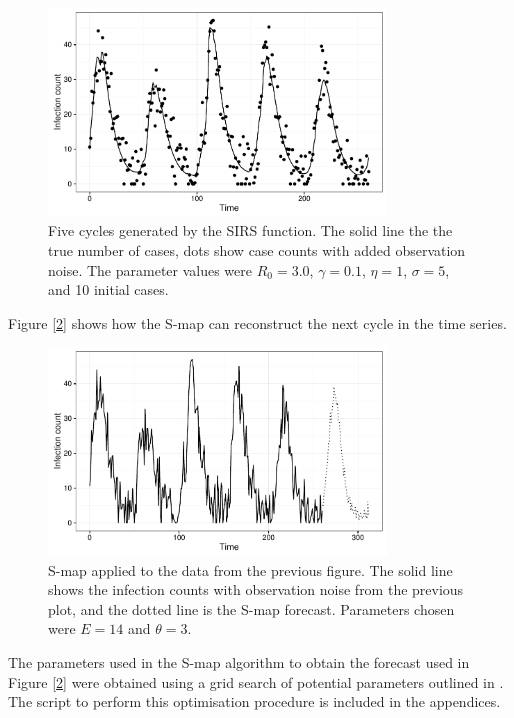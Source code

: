 	\begin{figure}
        \centering
        \captionsetup{width=.8\linewidth}
        \includegraphics[width=0.8\textwidth]{./images/dataplot.pdf}
        \caption{Five cycles generated by the SIRS function. The solid line the the true number of cases, dots show case counts with added observation noise. The parameter values were $R_0 = 3.0$, $\gamma = 0.1$, $\eta = 1$, $\sigma = 5$, and 10 initial cases. \label{sirsdataplot}}
    \end{figure}

    Figure [\ref{smap_project}] shows how the S-map can reconstruct the next cycle in the time series.

    \begin{figure}[H]
        \centering
        \captionsetup{width=.8\linewidth}
        \includegraphics[width=0.8\textwidth]{./images/smap-project.pdf}
        \caption{S-map applied to the data from the previous figure. The solid line shows the infection counts with observation noise from the previous plot, and the dotted line is the S-map forecast. Parameters chosen were $E = 14$ and $\theta = 3$. \label{smap_project}}
    \end{figure}

    The parameters used in the S-map algorithm to obtain the forecast used in Figure [\ref{smap_project}] were obtained using a grid search of potential parameters outlined in \cite{Glaser2014}. The script to perform this optimisation procedure is included in the appendices.


